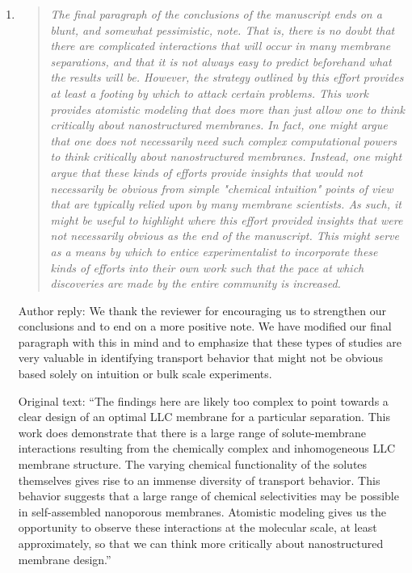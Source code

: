 \documentclass{article}
\begin{document}
\begin{enumerate}
    \item \begin{quote}
    \textit{The final paragraph of the conclusions of the manuscript ends on a blunt, and 
    somewhat pessimistic, note. That is, there is no doubt that there are complicated 
    interactions that will occur in many membrane separations, and that it is not always 
    easy to predict beforehand what the results will be. However, the strategy outlined 
    by this effort provides at least a footing by which to attack certain problems. This
    work provides atomistic modeling that does more than just allow one to think critically
    about nanostructured membranes. In fact, one might argue that one does not necessarily
    need such complex computational powers to think critically about nanostructured 
    membranes. Instead, one might argue that these kinds of efforts provide insights that
    would not necessarily be obvious from simple "chemical intuition" points of view that 
    are typically relied upon by many membrane scientists. As such, it might be useful to
    highlight where this effort provided insights that were not necessarily obvious as the
    end of the manuscript. This might serve as a means by which to entice experimentalist
    to incorporate these kinds of efforts into their own work such that the pace at which
    discoveries are made by the entire community is increased.}
    \end{quote}
	
    Author reply: We thank the reviewer for encouraging us to strengthen our conclusions and
    to end on a more positive note. We have modified our final paragraph with this in mind 
    and to emphasize that these types of studies are very valuable in identifying transport
    behavior that might not be obvious based solely on intuition or bulk scale experiments.
    
    Original text: ``The findings here are likely too complex to point towards a clear 
    design of an optimal LLC membrane for a particular separation. This work does demonstrate
    that there is a large range of solute-membrane interactions resulting from the
    chemically complex and inhomogeneous LLC membrane structure. The varying chemical 
    functionality of the solutes themselves gives rise to an immense diversity of transport 
    behavior. This behavior suggests that a large range of chemical selectivities may be 
    possible in self-assembled nanoporous membranes. Atomistic modeling gives us the 
    opportunity to observe these interactions at the molecular scale, at least approximately,
    so that we can think more critically about nanostructured membrane design.''
    

\end{enumerate}
\end{document}
